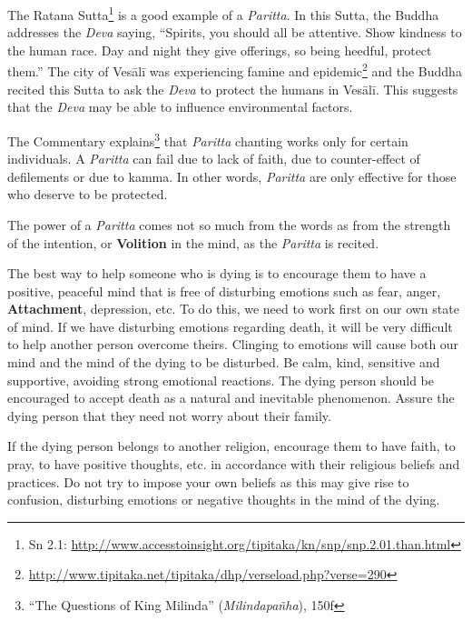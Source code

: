 
The Ratana Sutta\footnote{Sn 2.1: \url{http://www.accesstoinsight.org/tipitaka/kn/snp/snp.2.01.than.html}} is a good example of a \textit{Paritta}. In this Sutta, the Buddha addresses the \textit{Deva} saying, “Spirits, you should all be attentive. Show kindness to the human race. Day and night they give offerings, so being heedful, protect them.” The city of Vesālī was experiencing famine and epidemic\footnote{\url{http://www.tipitaka.net/tipitaka/dhp/verseload.php?verse=290}} and the Buddha recited this Sutta to ask the \textit{Deva} to protect the humans in Vesālī. This suggests that the \textit{Deva} may be able to influence environmental factors.

The Commentary explains\footnote{“The Questions of King Milinda” (\textit{Milindapañha}), 150f} that \textit{Paritta} chanting works only for certain individuals. A \textit{Paritta} can fail due to lack of faith, due to counter-effect of defilements or due to kamma. In other words, \textit{Paritta} are only effective for those who deserve to be protected.

The power of a \textit{Paritta} comes not so much from the words as from the strength of the intention, or \textbf{Volition} in the mind, as the \textit{Paritta} is recited.


The best way to help someone who is dying is to encourage them to have a positive, peaceful mind that is free of disturbing emotions such as fear, anger, \textbf{Attachment}, depression, etc. To do this, we need to work first on our own state of mind. If we have disturbing emotions regarding death, it will be very difficult to help another person overcome theirs. Clinging to emotions will cause both our mind and the mind of the dying to be disturbed. Be calm, kind, sensitive and supportive, avoiding strong emotional reactions. The dying person should be encouraged to accept death as a natural and inevitable phenomenon. Assure the dying person that they need not worry about their family.

If the dying person belongs to another religion, encourage them to have faith, to pray, to have positive thoughts, etc. in accordance with their religious beliefs and \color{blue} practices\color{black}. Do not try to impose your own beliefs as this may give rise to confusion, disturbing emotions or negative thoughts in the mind of the dying.

